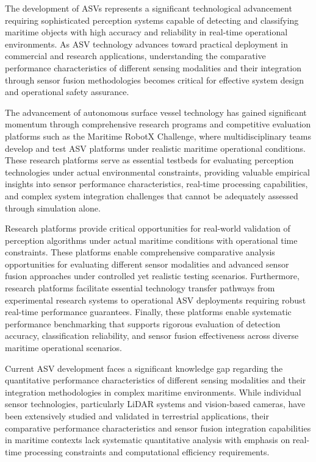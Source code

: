 \documentclass{erauthesis}
\begin{document}
The development of \acp{ASV} represents a significant technological advancement requiring sophisticated perception systems capable of detecting and classifying maritime objects with high accuracy and reliability in real-time operational environments. As \ac{ASV} technology advances toward practical deployment in commercial and research applications, understanding the comparative performance characteristics of different sensing modalities and their integration through sensor fusion methodologies becomes critical for effective system design and operational safety assurance.

The advancement of autonomous surface vessel technology has gained significant momentum through comprehensive research programs and competitive evaluation platforms such as the Maritime RobotX Challenge, where multidisciplinary teams develop and test \ac{ASV} platforms under realistic maritime operational conditions. These research platforms serve as essential testbeds for evaluating perception technologies under actual environmental constraints, providing valuable empirical insights into sensor performance characteristics, real-time processing capabilities, and complex system integration challenges that cannot be adequately assessed through simulation alone.

Research platforms provide critical opportunities for real-world validation of perception algorithms under actual maritime conditions with operational time constraints. These platforms enable comprehensive comparative analysis opportunities for evaluating different sensor modalities and advanced sensor fusion approaches under controlled yet realistic testing scenarios. Furthermore, research platforms facilitate essential technology transfer pathways from experimental research systems to operational \ac{ASV} deployments requiring robust real-time performance guarantees. Finally, these platforms enable systematic performance benchmarking that supports rigorous evaluation of detection accuracy, classification reliability, and sensor fusion effectiveness across diverse maritime operational scenarios.

Current \ac{ASV} development faces a significant knowledge gap regarding the quantitative performance characteristics of different sensing modalities and their integration methodologies in complex maritime environments. While individual sensor technologies, particularly \ac{LiDAR} systems and vision-based cameras, have been extensively studied and validated in terrestrial applications, their comparative performance characteristics and sensor fusion integration capabilities in maritime contexts lack systematic quantitative analysis with emphasis on real-time processing constraints and computational efficiency requirements.
\end{document}
